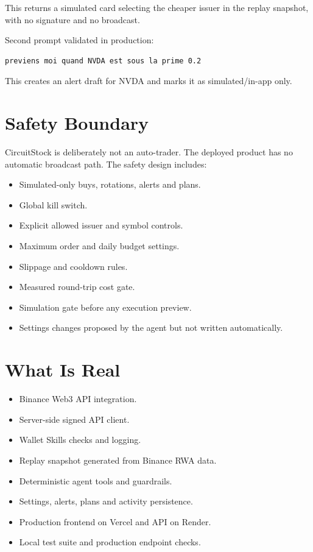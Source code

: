\documentclass[11pt,a4paper]{article}
\begin{document}
This returns a simulated card selecting the cheaper issuer in the replay snapshot, with no signature and no broadcast.

Second prompt validated in production:

\begin{verbatim}
previens moi quand NVDA est sous la prime 0.2
\end{verbatim}

This creates an alert draft for NVDA and marks it as simulated/in-app only.

\section{Safety Boundary}

CircuitStock is deliberately not an auto-trader. The deployed product has no automatic broadcast path. The safety design includes:

\begin{itemize}
  \item Simulated-only buys, rotations, alerts and plans.
  \item Global kill switch.
  \item Explicit allowed issuer and symbol controls.
  \item Maximum order and daily budget settings.
  \item Slippage and cooldown rules.
  \item Measured round-trip cost gate.
  \item Simulation gate before any execution preview.
  \item Settings changes proposed by the agent but not written automatically.
\end{itemize}

\section{What Is Real}

\begin{itemize}
  \item Binance Web3 API integration.
  \item Server-side signed API client.
  \item Wallet Skills checks and logging.
  \item Replay snapshot generated from Binance RWA data.
  \item Deterministic agent tools and guardrails.
  \item Settings, alerts, plans and activity persistence.
  \item Production frontend on Vercel and API on Render.
  \item Local test suite and production endpoint checks.
\end{itemize}
\end{document}
